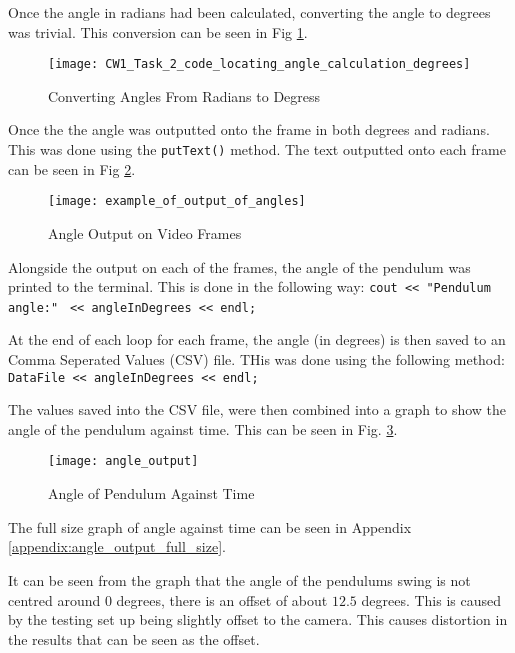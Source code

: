 \documentclass[conference]{IEEEtran}
\begin{document}
Once the angle in radians had been calculated, converting the angle to degrees was trivial. This conversion can be seen in Fig \ref{fig:CW1_Task_2_code_locating_angle_calculation_degrees}.

\begin{figure}
\centerline{\texttt{[image: CW1\_Task\_2\_code\_locating\_angle\_calculation\_degrees]}}
\caption{Converting Angles From Radians to Degress}
\label{fig:CW1_Task_2_code_locating_angle_calculation_degrees}
\end{figure}

Once the the angle was outputted onto the frame in both degrees and radians. This was done using the \verb|putText()| method. The text outputted onto each frame can be seen in Fig \ref{fig:example_of_output_of_angles}.

\begin{figure}
\centerline{\texttt{[image: example\_of\_output\_of\_angles]}}
\caption{Angle Output on Video Frames}
\label{fig:example_of_output_of_angles}
\end{figure}

Alongside the output on each of the frames, the angle of the pendulum was printed to the terminal. This is done in the following way: \verb|cout << "Pendulum angle:"|
\verb| << angleInDegrees << endl;|

At the end of each loop for each frame, the angle (in degrees) is then saved to an Comma Seperated Values (CSV) file. THis was done using the following method: \verb|DataFile << angleInDegrees << endl;|

The values saved into the CSV file, were then combined into a graph to show the angle of the pendulum against time. This can be seen in Fig. \ref{fig:angle_output}.

\begin{figure}
\centerline{\texttt{[image: angle\_output]}}
\caption{Angle of Pendulum Against Time}
\label{fig:angle_output}
\end{figure}

The full size graph of angle against time can be seen in Appendix \ref{appendix:angle_output_full_size}.

It can be seen from the graph that the angle of the pendulums swing is not centred around $0$ degrees, there is an offset of about $12.5$ degrees. This is caused by the testing set up being slightly offset to the camera. This causes distortion in the results that can be seen as the offset. 
\end{document}
